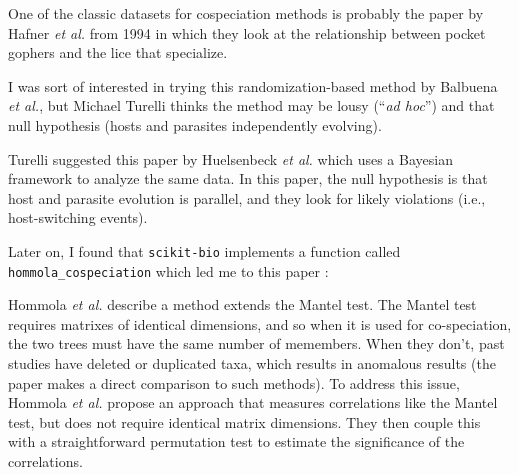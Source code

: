 One of the classic datasets for cospeciation methods is probably the paper by 
Hafner {\em et al.} from 1994 in which they look at the relationship between pocket
gophers and the lice that specialize. 


I was sort of interested in trying this randomization-based method by Balbuena 
{\em et al.}, but Michael Turelli thinks the method may be lousy (``{\em ad hoc}'') and 
that null hypothesis (hosts and parasites independently evolving).


Turelli suggested this paper by Huelsenbeck {\em et al.} which uses a Bayesian
framework to analyze the same data. In this paper, the null hypothesis is that
host and parasite evolution is parallel, and they look for likely violations
(i.e., host-switching events).


Later on, I found that {\tt scikit-bio} implements a function called {\tt hommola\_cospeciation} %
which led me to this paper :


Hommola {\em et al.} describe a method extends the Mantel test. \cite{mantel1967detection} The Mantel test
requires matrixes of identical dimensions, and so when it is used for 
co-speciation, the two trees must have the same number of memembers. When
they don't, past studies have deleted or duplicated taxa, which results in
anomalous results (the paper makes a direct comparison to such methods).
To address this issue, Hommola {\em et al.} \cite{hommola2009permutation} propose an approach that measures
correlations like the Mantel test, but does not require identical matrix
dimensions. They then couple this with a straightforward permutation test 
to estimate the significance of the correlations.


